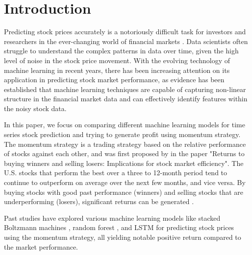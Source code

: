 \documentclass{article}
\begin{document}
\newpage
\thispagestyle{empty} 
\setlength{\cftbeforesecskip}{1.5\cftbeforesecskip}
\tableofcontents
\thispagestyle{empty} 
\clearpage

\newpage
\setcounter{page}{1}




\section{Introduction}
Predicting stock prices accurately is a notoriously difficult task for investors and researchers in the ever-changing world of financial markets \citep{enke2005use, nti2020systematic}. Data scientists often struggle to understand the complex patterns in data over time, given the high level of noise in the stock price movement. With the evolving technology of machine learning in recent years, there has been increasing attention on its application in predicting stock market performance, as evidence has been established that machine learning techniques are capable of capturing non-linear structure in the financial market data and can effectively identify features within the noisy stock data.


In this paper, we focus on comparing different machine learning models for time series stock prediction and trying to generate profit using momentum strategy. The momentum strategy is a trading strategy based on the relative performance of stocks against each other, and was first proposed by \cite{jegadeesh1993returns} in the paper "Returns to buying winners and selling losers: Implications for stock market efficiency". The U.S. stocks that perform the best over a three to 12-month period tend to continue to outperform on average over the next few months, and vice versa. By buying stocks with good past performance (winners) and selling stocks that are underperforming (losers), significant returns can be generated \citep{takeuchi2013applying, krauss2017deep, fischer2018deep}.

Past studies have explored various machine learning models like stacked Boltzmann machines \citep{takeuchi2013applying}, random forest \citep{krauss2017deep, zhang2022statistical}, and LSTM \citep{fischer2018deep, fjellstrom2022long} for predicting stock prices using the momentum strategy, all yielding notable positive return compared to the market performance. 
\end{document}
